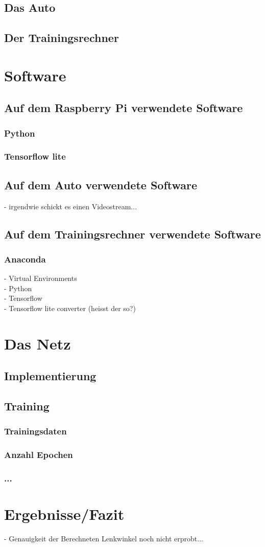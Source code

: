\documentclass[a4paper, 12pt]{scrartcl}
\begin{document}
		\subsection{Das Auto}
		\subsection{Der Trainingsrechner}
	
	\section{Software}
		\subsection{Auf dem Raspberry Pi verwendete Software}
			\subsubsection{Python}
			\subsubsection{Tensorflow lite}
		\subsection{Auf dem Auto verwendete Software}
		- irgendwie schickt es einen Videostream...
		\subsection{Auf dem Trainingsrechner verwendete Software}
			\subsubsection{Anaconda}
			- Virtual Environments \\
			- Python \\
			- Tensorflow \\
			- Tensorflow lite converter (heisst der so?) \\
			
		\section{Das Netz}
			\subsection{Implementierung}
			\subsection{Training}
				\subsubsection{Trainingsdaten}
				\subsubsection{Anzahl Epochen}
				\subsubsection{...}
			
	\section{Ergebnisse/Fazit}
	- Genauigkeit der Berechneten Lenkwinkel noch nicht erprobt...
\end{document}
